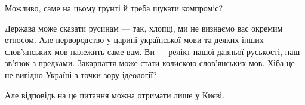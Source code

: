 Можливо, саме на цьому грунті й треба шукати компроміс?

Держава може сказати русинам --- так, хлопці, ми не визнаємо вас окремим етносом.
Але первородство у царині української мови та деяких інших слов’янських мов
належить саме вам. Ви --- релікт нашої давньої руськості, наш зв'язок з предками.
Закарпаття може стати колискою слов’янських мов. Хіба це не вигідно Україні з
точки зору ідеології?

Але відповідь на це питання можна отримати лише у Києві.

